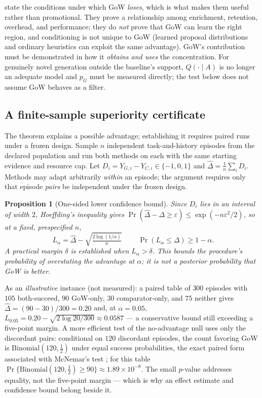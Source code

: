 \documentclass[11pt]{article}
\theoremstyle{gowthm}
\theoremstyle{gowplain}
\newtheorem{proposition}{Proposition}[section]
\begin{document}
 state the conditions under which GoW \emph{loses},
which is what makes them useful rather than promotional. They prove a
relationship among enrichment, retention, overhead, and performance; they do
\emph{not} prove that GoW can learn the right region, and conditioning is not
unique to GoW (learned proposal distributions and ordinary heuristics can
exploit the same advantage). GoW's contribution must be demonstrated in how it
\emph{obtains and uses} the concentration. For genuinely novel generation
outside the baseline's support, $Q(\cdot\mid A)$ is no longer an adequate model
and $p_G$ must be measured directly; the test below does not assume GoW behaves
as a filter.

\subsection{A finite-sample superiority certificate}
\label{sec:superiority-cert}
The theorem explains a possible advantage; establishing it requires paired runs
under a frozen design. Sample $n$ independent task-and-history episodes from the
declared population and run both methods on each with the same starting evidence
and resource cap. Let $D_i = Y_{G,i} - Y_{C,i} \in \{-1,0,1\}$ and
$\widehat{\Delta} = \tfrac1n\sum_i D_i$. Methods may adapt arbitrarily
\emph{within} an episode; the argument requires only that episode \emph{pairs}
be independent under the frozen design.

\begin{proposition}[One-sided lower confidence bound]
\label{prop:hoeffding}
Since $D_i$ lies in an interval of width $2$, Hoeffding's inequality
\citep{hoeffding1963probability} gives
$\Pr(\widehat{\Delta} - \Delta \ge \varepsilon) \le \exp(-n\varepsilon^2/2)$, so
at a \emph{fixed, prespecified} $n$,
\[
  \boxed{\;L_\alpha = \widehat{\Delta} - \sqrt{\tfrac{2\log(1/\alpha)}{n}}\;}
  \qquad \Pr(L_\alpha \le \Delta) \ge 1-\alpha.
\]
A practical margin $\delta$ is established when $L_\alpha > \delta$. This bounds
the procedure's probability of overstating the advantage at $\alpha$; it is not
a posterior probability that GoW is better.
\end{proposition}

As an \emph{illustrative} instance (not measured): a paired table of $300$
episodes with $105$ both-succeed, $90$ GoW-only, $30$ comparator-only, and $75$
neither gives $\widehat{\Delta} = (90-30)/300 = 0.20$ and, at $\alpha=0.05$,
$L_{0.05} = 0.20 - \sqrt{2\log 20 / 300} \approx 0.0587$ --- a conservative
bound still exceeding a five-point margin. A more efficient test of the
no-advantage null uses only the discordant pairs: conditional on $120$
discordant episodes, the count favoring GoW is $\mathrm{Binomial}(120,\tfrac12)$
under equal success probabilities, the exact paired form associated with
McNemar's test \citep{mcnemar1947note}; for this table
$\Pr\{\mathrm{Binomial}(120,\tfrac12) \ge 90\} \approx 1.89\times 10^{-8}$. The
small $p$-value addresses equality, not the five-point margin --- which is why an
effect estimate and confidence bound belong beside it.
\end{document}
